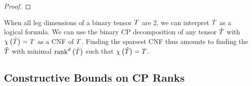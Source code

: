 \begin{proof}
\end{proof}



\begin{example}
	When all leg dimensions of a binary tensor $T$ are $2$, we can interpret $T$ as a logical formula.
	We can use the binary CP decomposition of any tensor $\tilde{T}$ with $\chi\left(\tilde{T}\right)=T$ as a CNF of $T$.
	Finding the sparsest CNF thus amounts to finding the $\tilde{T}$ with minimal $\mathrm{rank}^{d}\left(\tilde{T}\right)$ such that $\chi\left(\tilde{T}\right)=T$.
\end{example}











\subsection{Constructive Bounds on CP Ranks}

